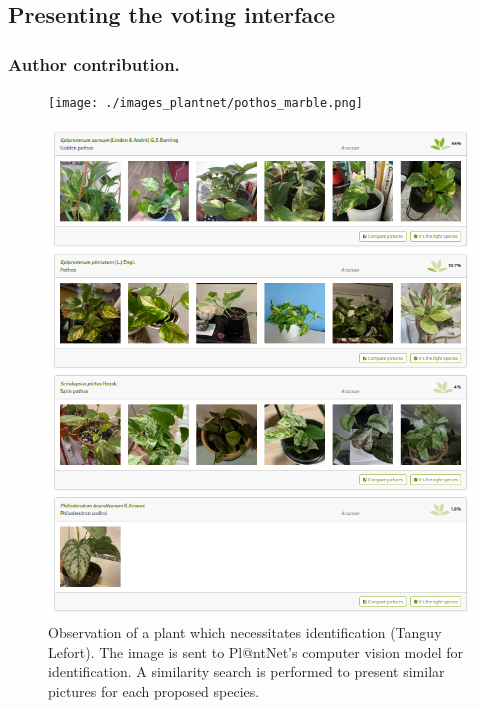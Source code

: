 \subsection{Presenting the voting interface}

\subsubsection{Author contribution.}

\begin{figure}[H]
        \centering
        \begin{minipage}[b]{0.38\textwidth}
            \centering
            \texttt{[image: ./images\_plantnet/pothos\_marble.png]}
            \caption*{Observation of a plant which necessitates identification (\textcopyright Tanguy Lefort). The image is sent to Pl@ntNet's computer vision model for identification. A similarity search is performed to present similar pictures for each proposed species.}
        \end{minipage}
        \hfill
        \begin{minipage}[b]{0.55\textwidth}
            \centering
            \includegraphics[width=\textwidth]{./images_plantnet/pothos_marble_plantnet.png}

\end{minipage}
\end{figure}
